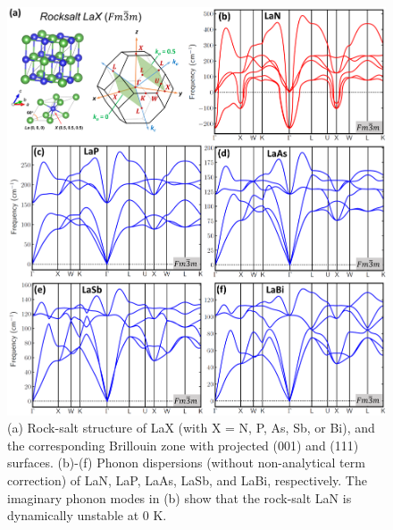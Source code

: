 		
	\begin{figure}
		\includegraphics[width=\textwidth]{LaN_1.png}
        \captionsetup{singlelinecheck = false, justification=justified}
		\caption[Rock-salt crystal structure, Brillouin zone, and phonon dispersion of lanthanum monopnictides.]{(a) Rock-salt structure of LaX (with X = N, P, As, Sb, or Bi), and the corresponding Brillouin zone with projected (001) and (111) surfaces. (b)-(f) Phonon dispersions (without non-analytical term correction) of LaN, LaP, LaAs, LaSb, and LaBi, respectively. The imaginary phonon modes in (b) show that the rock-salt LaN is dynamically unstable at 0 K.}
		\label{fig:LaX_phonon}
	\end{figure}
	
